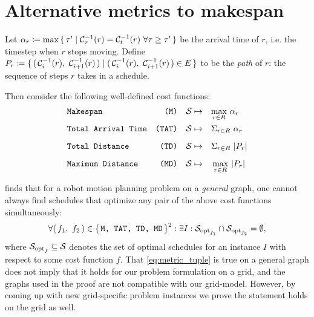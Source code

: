 \section{Alternative metrics to makespan}\label{chapter:alternative_metrics}

Let \(\alpha_r \coloneqq \max\set{\tau' \mid \ensuremath{\mathcal{C}_{\tau}}^{-1}(r) = \ensuremath{\mathcal{C}_{t}}^{-1}(r)\ \forall \tau \geq \tau'}\) be the arrival time of \(r\), i.e. the timestep when \(r\) stops moving. 
Define \(P_r \coloneqq \set{ (\,  \ensuremath{\mathcal{C}_{i}}^{-1}(r),\ \ensuremath{\mathcal{C}_{i + 1}}^{-1}(r)  \,) \mid (\,  \ensuremath{\mathcal{C}_{i}}^{-1}(r),\ \ensuremath{\mathcal{C}_{i + 1}}^{-1}(r)  \,) \in E }\) to be the \emph{path} of \(r\): the sequence of steps \(r\) takes in a schedule. 

Then consider the following well-defined cost functions:
\begin{align*}
	& \texttt{Makespan} 				& \texttt{(M)} && \mathcal{S} \mapsto \quad & \smash{\max_{r \in R}} \ \alpha_r 	\\[2mm] 
	& \texttt{Total Arrival Time} 	& \texttt{(TAT)} && \mathcal{S} \mapsto \quad & \Sigma_{r \in R} \ \alpha_r 		\\[2mm]
	& \texttt{Total Distance} 		& \texttt{(TD)} && \mathcal{S} \mapsto \quad & \Sigma_{r \in R} \ \lvert P_r\rvert 		\\[2mm]
	& \texttt{Maximum Distance} 		& \texttt{(MD)} && \mathcal{S} \mapsto \quad & \max_{r \in R} \ \lvert P_r\rvert
\end{align*}


\cite{corr/YuL15c} finds that for a robot motion planning problem on a \emph{general} graph, one cannot always find schedules that optimize any pair of the above cost functions simultaneously: 
\begin{align}\label{eq:metric_tuple}
	\forall (\, f_1,\ f_2 \,) \in \set{\texttt{M, TAT, TD, MD}}^2 : \exists I : \mathcal{S}_{\text{opt}_{f_1}} \cap \mathcal{S}_{\text{opt}_{f_2}} = \emptyset,
\end{align}
where \(\mathcal{S}_{\text{opt}_f} \subseteq \mathcal{S}\) denotes the set of optimal schedules for an instance \(I\) with respect to some cost function \(f\). 
That \cref{eq:metric_tuple} is true on a general graph does not imply that it holds for our problem formulation on a grid, and the graphs used in the proof are not compatible with our grid-model. 
However, by coming up with new grid-specific problem instances we prove the statement holds on the grid as well.

